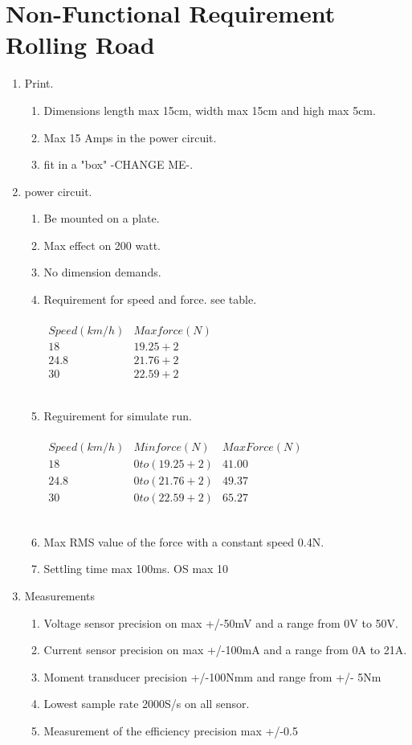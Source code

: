 \section{Non-Functional Requirement Rolling Road}

\begin{enumerate}
	\item Print.
	\begin{enumerate}
		\item Dimensions length max 15cm, width max 15cm and high max 5cm.
		\item Max 15 Amps in the power circuit.
		\item fit in a "box" -CHANGE ME-.
	\end{enumerate}
	\item power circuit. 
	\begin{enumerate}
		\item Be mounted on a plate.
		\item Max effect on 200 watt.
		\item No dimension demands.
		\item Requirement for speed and force. see table.\\\\
		$\begin{array}{cc}
			Speed (km/h) & Max force (N) \\ 
			18 & 19.25+2 \\ 
			24.8 & 21.76+2 \\ 
			30 & 22.59+2
		\end{array} $\\\\
		\item Reguirement for simulate run.\\\\
		$\begin{array}{ccc}
			Speed (km/h) & Min force (N) & Max Force (N) \\ 
			18 & 0 to (19.25+2) & 41.00 \\ 
			24.8 & 0 to (21.76+2) & 49.37 \\ 
			30 & 0 to (22.59+2) & 65.27
		\end{array}$\\\\ 
		\item Max RMS value of the force with a constant speed 0.4N.
		\item Settling time max 100ms. OS max 10%
	\end{enumerate}
	\item Measurements
	\begin{enumerate}
		\item Voltage sensor precision on max +/-50mV and a range from 0V to 50V.
		\item Current sensor precision on max +/-100mA and a range from 0A to 21A.
		\item Moment transducer precision +/-100Nmm and range from +/- 5Nm
		\item Lowest sample rate 2000S/s on all sensor.
		\item Measurement of the efficiency precision max +/-0.5%
	\end{enumerate} 
\end{enumerate}


